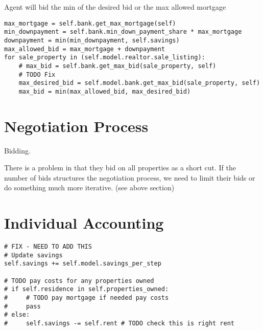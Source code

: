 Agent will bid the min of the desired bid or the max allowed mortgage
\begin{lstlisting}
max_mortgage = self.bank.get_max_mortgage(self)
min_downpayment = self.bank.min_down_payment_share * max_mortgage
downpayment = min(min_downpayment, self.savings)
max_allowed_bid = max_mortgage + downpayment
for sale_property in (self.model.realtor.sale_listing):
    # max_bid = self.bank.get_max_bid(sale_property, self)
    # TODO Fix
    max_desired_bid = self.model.bank.get_max_bid(sale_property, self)
    max_bid = min(max_allowed_bid, max_desired_bid)
\end{lstlisting}

\section{Negotiation Process}

Bidding.

There is a problem in that they bid on all properties as a short cut. If the number of bids structures the negotiation process, we need to limit their bids or do something much more iterative. (see above section)




\section{Individual Accounting}

\begin{lstlisting}
# FIX - NEED TO ADD THIS
# Update savings
self.savings += self.model.savings_per_step

# TODO pay costs for any properties owned
# if self.residence in self.properties_owned:
#     # TODO pay mortgage if needed pay costs
#     pass
# else:
#     self.savings -= self.rent # TODO check this is right rent
\end{lstlisting}